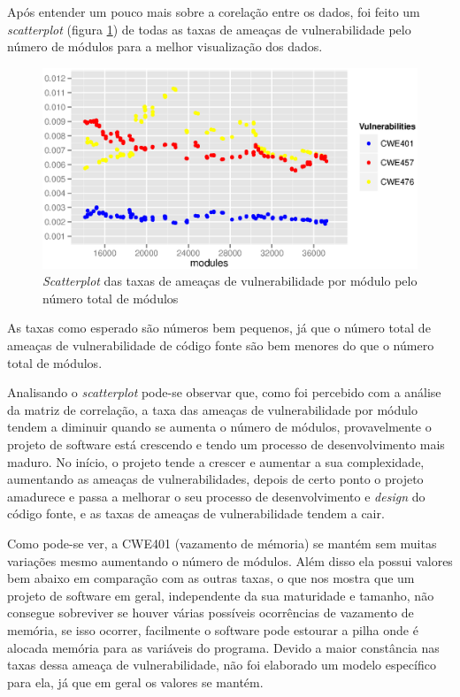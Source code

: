Após entender um pouco mais sobre a corelação entre os dados, foi feito um
\textit{scatterplot} (figura \ref{fig:scatterplot}) de todas as taxas de ameaças
de vulnerabilidade pelo número de módulos para a melhor visualização dos dados.

\begin{figure}[h]
  \centering
  \includegraphics[width=1.0\textwidth]
      {figuras/scatterplot.eps}
      \caption{\textit{Scatterplot} das taxas de ameaças de vulnerabilidade por
      módulo pelo número total de módulos}
  \label{fig:scatterplot}
\end{figure}

As taxas como esperado são números bem pequenos, já que o número total de
ameaças de vulnerabilidade de código fonte são bem menores do que o número total
de módulos.

Analisando o \textit{scatterplot} pode-se observar que, como foi percebido com a
análise da matriz de correlação, a taxa das ameaças de vulnerabilidade por módulo
tendem a diminuir quando se aumenta o número de módulos, provavelmente o projeto
de software está crescendo e tendo um processo de desenvolvimento mais maduro.
No início, o projeto tende a crescer e aumentar a sua complexidade, aumentando
as ameaças de vulnerabilidades, depois de certo ponto o projeto amadurece e
passa a melhorar o seu processo de desenvolvimento e \textit{design} do código
fonte, e as taxas de ameaças de vulnerabilidade tendem a cair.

Como pode-se ver, a CWE401 (vazamento de mémoria) se mantém sem muitas variações
mesmo aumentando o número de módulos. Além disso ela possui valores bem abaixo
em comparação com as outras taxas, o que nos mostra que um projeto de software
em geral, independente da sua maturidade e tamanho, não consegue sobreviver se
houver várias possíveis ocorrências de vazamento de memória, se isso ocorrer,
facilmente o software pode estourar a pilha onde é alocada memória para as
variáveis do programa. Devido a maior constância nas taxas dessa ameaça de
vulnerabilidade, não foi elaborado um modelo específico para ela, já que em
geral os valores se mantém.

